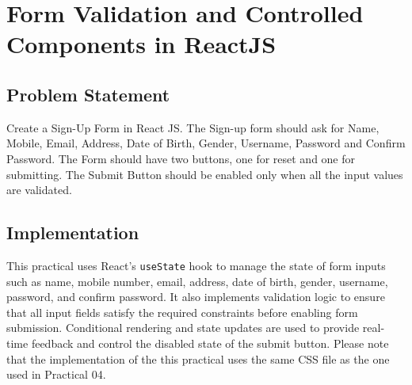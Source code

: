 \documentclass[12pt, a4paper]{report}
\begin{document}
    \chapter{Form Validation and Controlled Components in ReactJS}

    \section{Problem Statement}
    Create a Sign-Up Form in React JS. The Sign-up form should ask for Name, Mobile, Email, Address, Date of Birth, Gender, Username, Password and Confirm Password. The Form should have two buttons, one for reset and one for submitting. The Submit Button should be enabled only when all the input values are validated.

    \section{Implementation}
    This practical uses React's \texttt{useState} hook to manage the state of form inputs such as name, mobile number, email, address, date of birth, gender, username, password, and confirm password. It also implements validation logic to ensure that all input fields satisfy the required constraints before enabling form submission. Conditional rendering and state updates are used to provide real-time feedback and control the disabled state of the submit button.
    Please note that the implementation of the this practical uses the same CSS file as the one used in Practical 04.
\end{document}
